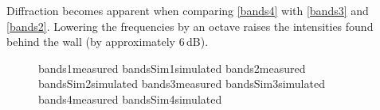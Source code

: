 Diffraction becomes apparent when comparing \ref{bands4} with \ref{bands3} and \ref{bands2}. Lowering the frequencies by an octave raises the intensities found behind the wall (by approximately 6\,dB).


\begin{figure}
	{bands1}{measured}
	{bandsSim1}{simulated}
	{bands2}{measured}
	{bandsSim2}{simulated}
	{bands3}{measured}
	{bandsSim3}{simulated}
	{bands4}{measured}
	{bandsSim4}{simulated}
\end{figure}





